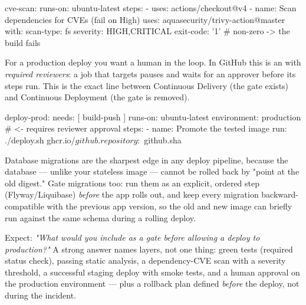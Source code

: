 \begin{yamlbox}
  cve-scan:
    runs-on: ubuntu-latest
    steps:
      - uses: actions/checkout@v4
      - name: Scan dependencies for CVEs (fail on High)
        uses: aquasecurity/trivy-action@master
        with:
          scan-type: fs
          severity: HIGH,CRITICAL
          exit-code: '1'      # non-zero -> the build fails
\end{yamlbox}

 For a production deploy you want a human in the loop. In GitHub this is an  with \emph{required reviewers}: a job that targets  pauses and waits for an approver before its steps run. This is the exact line between Continuous Delivery (the gate exists) and Continuous Deployment (the gate is removed).

\begin{yamlbox}
  deploy-prod:
    needs: [ build-push ]
    runs-on: ubuntu-latest
    environment: production   # <- requires reviewer approval
    steps:
      - name: Promote the tested image
        run: ./deploy.sh ghcr.io/${{ github.repository }}:${{ github.sha }}
\end{yamlbox}

\begin{dbinsight}
Database migrations are the sharpest edge in any deploy pipeline, because the database --- unlike your stateless image --- cannot be rolled back by "point at the old digest." Gate migrations too: run them as an explicit, ordered step (Flyway/Liquibase) \emph{before} the app rolls out, and keep every migration backward-compatible with the previous app version, so the old and new image can briefly run against the same schema during a rolling deploy.
\end{dbinsight}

\begin{interview}
Expect: \emph{"What would you include as a gate before allowing a deploy to production?"} A strong answer names layers, not one thing: green tests (required status check), passing static analysis, a dependency-CVE scan with a severity threshold, a successful staging deploy with smoke tests, and a human approval on the production environment --- plus a rollback plan defined \emph{before} the deploy, not during the incident.
\end{interview}


